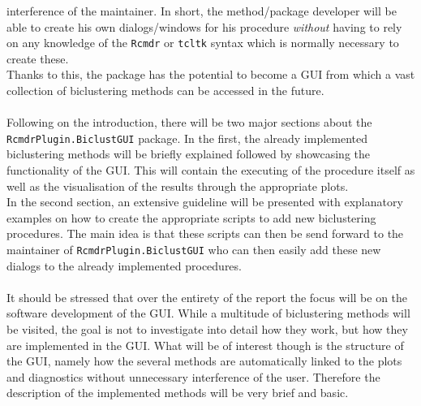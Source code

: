 \documentclass[a4paper]{article}\usepackage[]{graphicx}\usepackage[]{color}
\begin{document}
interference of the maintainer. In short, the method/package developer will be
able to create his own dialogs/windows for his procedure {\it without} having to
rely on any knowledge of the \verb|Rcmdr| or \verb|tcltk| syntax which is
normally necessary to create these.\\ 
Thanks to this, the package has the potential to become a GUI from which a
vast collection of biclustering methods can be accessed in the future.
\\ \\
Following on the introduction, there will be two major sections about the
\verb|RcmdrPlugin.BiclustGUI| package. In the first, the already implemented
biclustering methods will be briefly explained followed by showcasing the
functionality of the GUI. This will contain the executing of the procedure
itself as well as the visualisation of the results through the appropriate
plots.\\
In the second section, an extensive guideline will be presented with explanatory
examples on how to create the appropriate scripts to add new biclustering
procedures. The main idea is that these scripts can then be send forward to the
maintainer of \verb|RcmdrPlugin.BiclustGUI| who can then easily add these new
dialogs to the already implemented procedures.
\\ \\
It should be stressed that over the entirety of the report the focus will be on
the software development of the GUI. While a multitude of biclustering methods
will be visited, the goal is not to investigate into detail how they work, but
how they are implemented in the GUI. What will be of interest though is the
structure of the GUI, namely how the several methods are automatically linked to
the plots and diagnostics without unnecessary interference of the user.
Therefore the description of the implemented methods will be very brief and
basic.
\end{document}
